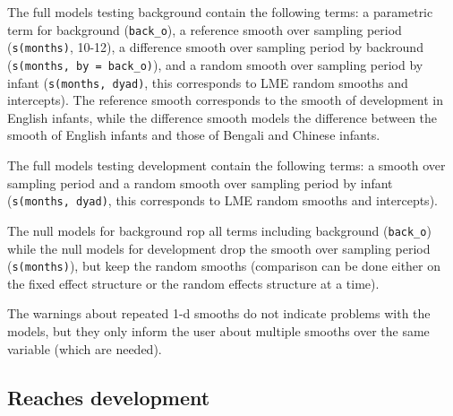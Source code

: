 \documentclass[]{article}
\newenvironment{Shaded}{\begin{snugshade}}{\end{snugshade}}
\newcommand{\DataTypeTok}[1]{\textcolor[rgb]{0.13,0.29,0.53}{#1}}
\newcommand{\FloatTok}[1]{\textcolor[rgb]{0.00,0.00,0.81}{#1}}
\newcommand{\KeywordTok}[1]{\textcolor[rgb]{0.13,0.29,0.53}{\textbf{#1}}}
\newcommand{\NormalTok}[1]{#1}
\newcommand{\OperatorTok}[1]{\textcolor[rgb]{0.81,0.36,0.00}{\textbf{#1}}}
\newcommand{\StringTok}[1]{\textcolor[rgb]{0.31,0.60,0.02}{#1}}
\begin{document}
The full models testing background contain the following terms: a
parametric term for background (\texttt{back\_o}), a reference smooth
over sampling period (\texttt{s(months)}, 10-12), a difference smooth
over sampling period by backround (\texttt{s(months,\ by\ =\ back\_o)}),
and a random smooth over sampling period by infant
(\texttt{s(months,\ dyad)}, this corresponds to LME random smooths and
intercepts). The reference smooth corresponds to the smooth of
development in English infants, while the difference smooth models the
difference between the smooth of English infants and those of Bengali
and Chinese infants.

The full models testing development contain the following terms: a
smooth over sampling period and a random smooth over sampling period by
infant (\texttt{s(months,\ dyad)}, this corresponds to LME random
smooths and intercepts).

The null models for background rop all terms including background
(\texttt{back\_o}) while the null models for development drop the smooth
over sampling period (\texttt{s(months)}), but keep the random smooths
(comparison can be done either on the fixed effect structure or the
random effects structure at a time).

The warnings about repeated 1-d smooths do not indicate problems with
the models, but they only inform the user about multiple smooths over
the same variable (which are needed).

\hypertarget{reaches-development}{%
\subsection{Reaches development}\label{reaches-development}}

\begin{Shaded}
\end{Shaded}
\end{document}
